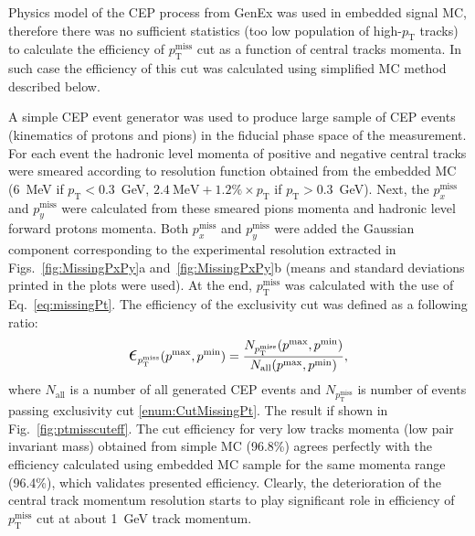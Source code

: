 Physics model of the CEP process from GenEx was used in embedded signal MC, therefore there was no sufficient statistics (too low population of high-$p_{\text{T}}$ tracks) to calculate the efficiency of $p_{\text{T}}^{\text{miss}}$ cut as a function of central tracks momenta. In such case the efficiency of this cut was calculated using simplified MC method described below.

A simple CEP event generator was used to produce large sample of CEP events (kinematics of protons and pions) in the fiducial phase space of the measurement. For each event the hadronic level momenta of positive and negative central tracks were smeared according to resolution function obtained from the embedded MC (6~MeV if $p_{\text{T}}<0.3$~GeV, $2.4~\text{MeV} + 1.2\%\times p_{\text{T}}$ if $p_{\text{T}}>0.3$~GeV). Next, the $p_{x}^{\text{miss}}$ and $p_{y}^{\text{miss}}$ were calculated from these smeared pions momenta and hadronic level forward protons momenta. Both $p_{x}^{\text{miss}}$ and $p_{y}^{\text{miss}}$ were added the Gaussian component corresponding to the experimental resolution extracted in Figs.~\ref{fig:MissingPxPy}a and~\ref{fig:MissingPxPy}b (means and standard deviations printed in the plots were used). At the end, $p_{\text{T}}^{\text{miss}}$ was calculated with the use of Eq.~\eqref{eq:missingPt}. The efficiency of the exclusivity cut was defined as a following ratio:
\begin{equation}\label{eq:ptMissCutEff}
 \mbox{\LARGE$\epsilon$}_{p_{\text{T}}^{\text{miss}}}(p^{\text{max}}, p^{\text{min}}) = \frac{N_{p_{\text{T}}^{\text{miss}}}(p^{\text{max}}, p^{\text{min}})}{N_{\text{all}}(p^{\text{max}}, p^{\text{min}})},
\end{equation}
where $N_{\text{all}}$ is a number of all generated CEP events and $N_{p_{\text{T}}^{\text{miss}}} $ is number of events passing exclusivity cut \ref{enum:CutMissingPt}. The result if shown in Fig.~\ref{fig:ptmisscuteff}. The cut efficiency for very low tracks momenta (low pair invariant mass) obtained from simple MC (96.8\%) agrees perfectly with the efficiency calculated using embedded MC sample for the same momenta range (96.4\%), which validates presented efficiency. Clearly, the deterioration of the central track momentum resolution starts to play significant role in efficiency of $p_{\text{T}}^{\text{miss}}$ cut at about 1~GeV track momentum.


